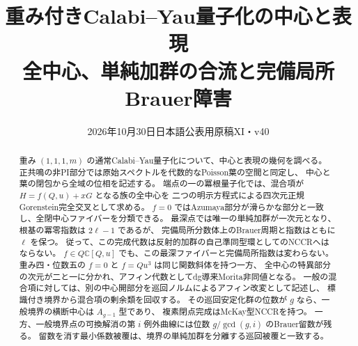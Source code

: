 
\title{重み付きCalabi--Yau量子化の中心と表現\\
\large 全中心、単純加群の合流と完備局所Brauer障害}
\author{}\date{2026年10月30日\quad 日本語公表用原稿XI・v40}
\maketitle
\begin{abstract}
重み $(1,1,1,m)$ の通常Calabi--Yau量子化について、中心と表現の幾何を調べる。
正共鳴の非PI部分では原始スペクトルを代数的なPoisson葉の空間と同定し、
中心と葉の閉包から全域の位相を記述する。
端点の一の冪根量子化では、混合項が $H=f(Q,u)+xG$ となる族の全中心を
二つの明示方程式による四次元正規Gorenstein完全交叉として求める。
$f=0$ ではAzumaya部分が滑らかな部分と一致し、全閉中心ファイバーを分類できる。
最深点では唯一の単純加群が一次元となり、根基の冪零指数は $2\ell-1$ であるが、
完備局所分数体上のBrauer周期と指数はともに $\ell$ を保つ。
従って、この完成代数は反射的加群の自己準同型環としてのNCCRへはならない。
$f\in Q\mathbb C[Q,u]$ でも、この最深ファイバーと完備局所指数は変わらない。
重み四・位数五の $f=0$ と $f=Qu^3$ は同じ関数斜体を持つ一方、
全中心の特異部分の次元が二と一に分かれ、アフィン代数としてdg導来Morita非同値となる。
一般の混合項に対しては、別の中心開部分を巡回ノルムによるアフィン改変として記述し、
標識付き境界から混合項の剰余類を回収する。
その巡回安定化群の位数が $g$ なら、一般境界の横断中心は $A_{g-1}$ 型であり、
複素閉点完成はMcKay型NCCRを持つ。
一方、一般境界点の可換解消の第 $i$ 例外曲線には位数 $g/\gcd(g,i)$ のBrauer留数が残る。
留数を消す最小係数被覆は、境界の単純加群を分離する巡回被覆と一致する。
\end{abstract}
\tableofcontents\clearpage















